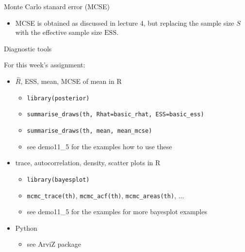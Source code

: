 \documentclass[finnish,english,t]{beamer}
\def\ESS{\text{ESS}}
\begin{document}
\begin{frame}{Monte Carlo stanard error (MCSE)}

  \begin{itemize}
  \item MCSE is obtained as discussed in lecture 4, but replacing the
    sample size $S$ with the effective sample size $\ESS$.
  \end{itemize}
  
\end{frame}

\begin{frame}{Diagnostic tools}

  For this week's assignment:
  \begin{itemize}
  \item<+-> $\widehat{R}$, ESS, mean, MCSE of mean in R
    \begin{itemize}
    \item \texttt{library(posterior)}
    \item \texttt{summarise\_draws(th, Rhat=basic\_rhat, ESS=basic\_ess)}
    \item \texttt{summarise\_draws(th, mean, mean\_mcse)}
    \item see demo11\_5 for the examples how to use these
    \end{itemize}
  \item<+-> trace, autocorrelation, density, scatter plots in R
    \begin{itemize}
    \item \texttt{library(bayesplot)}
    \item \texttt{mcmc\_trace(th)}, \texttt{mcmc\_acf(th)}, \texttt{mcmc\_areas(th)}, ...
    \item see demo11\_5 for the examples for more bayesplot examples
    \end{itemize}
  \item<+-> Python
    \begin{itemize}
    \item see ArviZ package
    \end{itemize}
  \end{itemize}
  
\end{frame}
\end{document}
